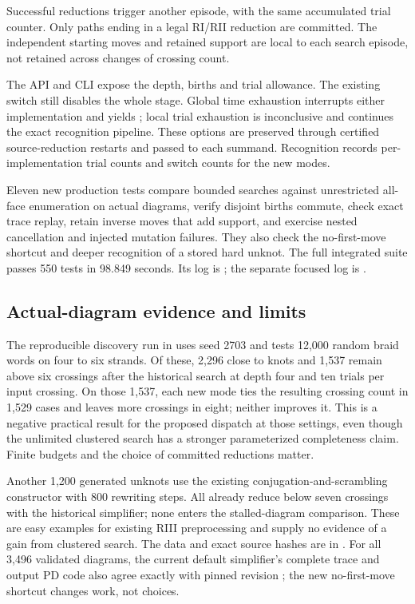Successful reductions trigger another episode, with the same accumulated
trial counter.  Only paths ending in a legal RI/RII reduction are committed.
The independent starting moves and retained support are local to each search
episode, not retained across changes of crossing count.

The API and CLI expose the depth, births and trial allowance.  The existing
 switch still disables the whole stage.  Global time
exhaustion interrupts either implementation and yields ; local
trial exhaustion is inconclusive and continues the exact recognition
pipeline.  These options are preserved through certified source-reduction
restarts and passed to each summand.  Recognition records per-implementation
trial counts and switch counts for the new modes.

Eleven new production tests compare bounded searches against unrestricted
all-face enumeration on actual diagrams, verify disjoint births commute,
check exact trace replay, retain inverse moves that add support, and exercise
nested cancellation and injected mutation failures.  They also check the
no-first-move shortcut and deeper recognition of a stored hard unknot.
The full integrated suite passes 550 tests in 98.849 seconds.  Its log is
; the separate focused log is
.

\subsection{Actual-diagram evidence and limits}
The reproducible discovery run in  uses seed
2703 and tests 12,000 random braid words on four to six strands.  Of these,
2,296 close to knots and 1,537 remain above six crossings after the historical
search at depth four and ten trials per input crossing.  On those 1,537,
each new mode ties the resulting crossing count in 1,529 cases and leaves
more crossings in eight; neither improves it.  This is a negative practical
result for the proposed dispatch at those settings, even though the
unlimited clustered search has a stronger parameterized completeness claim.
Finite budgets and the choice of committed reductions matter.

Another 1,200 generated unknots use the existing conjugation-and-scrambling
constructor with 800 rewriting steps.  All already reduce below seven
crossings with the historical simplifier; none enters the stalled-diagram
comparison.  These are easy examples for existing RIII preprocessing and
supply no evidence of a gain from clustered search.  The data and exact
source hashes are in .
For all 3,496 validated diagrams, the current default simplifier's complete
trace and output PD code also agree exactly with pinned revision
; the new no-first-move shortcut changes work, not choices.

